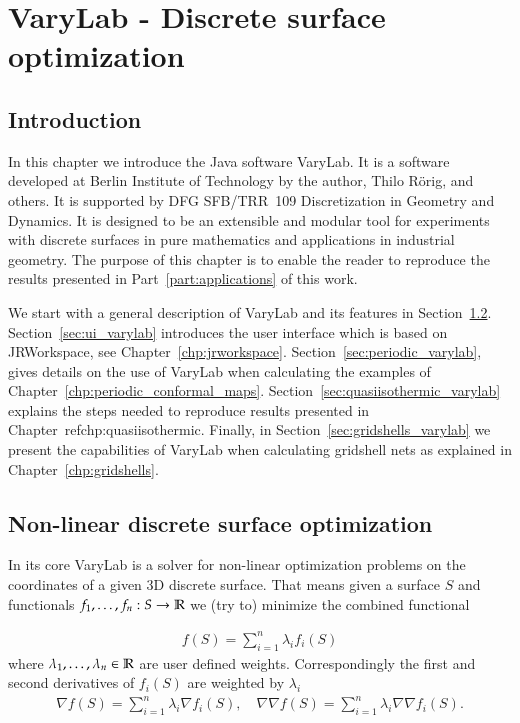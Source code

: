\documentclass[Thesis.tex]{subfiles}
\begin{document}
\chapter{{\sc VaryLab} - Discrete surface optimization}
\label{chp:varylab}

\section{Introduction}

In this chapter we introduce the {\sc Java} software {\sc VaryLab}. It is a software developed at Berlin Institute of Technology by the author, Thilo R\"orig, and others. It is supported by DFG \mbox{SFB/TRR}~109 Discretization in Geometry and Dynamics. It is designed to be an extensible and modular tool for experiments with discrete surfaces in pure mathematics and applications in industrial geometry. The purpose of this chapter is to enable the reader to reproduce the results presented in Part~\ref{part:applications} of this work.

We start with a general description of {\sc VaryLab} and its features in Section~\ref{sec:general_varylab}. Section~\ref{sec:ui_varylab} introduces the user interface which is based on {\sc JRWorkspace}, see Chapter~\ref{chp:jrworkspace}. Section~\ref{sec:periodic_varylab}, gives details on the use of {\sc VaryLab} when calculating the examples of Chapter~\ref{chp:periodic_conformal_maps}. Section~\ref{sec:quasiisothermic_varylab} explains the steps needed to reproduce results presented in Chapter~ref{chp:quasiisothermic}. Finally, in Section~\ref{sec:gridshells_varylab} we present the capabilities of {\sc VaryLab} when calculating gridshell nets as explained in Chapter~\ref{chp:gridshells}.

\section{Non-linear discrete surface optimization}
\label{sec:general_varylab}
In its core {\sc VaryLab} is a solver for non-linear optimization problems on the coordinates of a given 3D discrete surface. That means given a surface $S$ and functionals $f_1,\ldots,f_n:S\to\mathbb R$ we (try to) minimize the combined functional

\begin{eqnarray*}
	f(S) = \sum_{i=1}^n \lambda_i f_i(S)
\end{eqnarray*}
where $\lambda_1,\ldots,\lambda_n\in \mathbb R$ are user defined weights. Correspondingly the first and second  derivatives of $f_i(S)$ are weighted by $\lambda_i$
\begin{eqnarray*}
	\nabla f(S) = \sum_{i=1}^n \lambda_i \nabla f_i(S), \quad \nabla\nabla f(S) = \sum_{i=1}^n \lambda_i \nabla\nabla f_i(S).
\end{eqnarray*}
\end{document}
